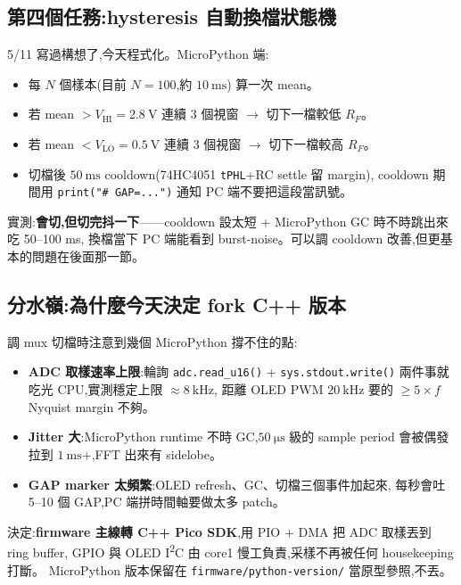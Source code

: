 \subsection*{第四個任務:hysteresis 自動換檔狀態機}

5/11 寫過構想了,今天程式化。MicroPython 端:

\begin{itemize}[leftmargin=2em,itemsep=0pt]
  \item 每 \(N\) 個樣本(目前 \(N = 100\),約 \(\SI{10}{\milli\second}\)) 算一次 mean。
  \item 若 mean \(> V_\text{HI} = \SI{2.8}{\volt}\) 連續 3 個視窗 \(\to\) 切下一檔較低 \(R_F\)。
  \item 若 mean \(< V_\text{LO} = \SI{0.5}{\volt}\) 連續 3 個視窗 \(\to\) 切下一檔較高 \(R_F\)。
  \item 切檔後 \(\SI{50}{\milli\second}\) cooldown(74HC4051 \texttt{tPHL}+RC settle 留 margin),
        cooldown 期間用 \texttt{print("\# GAP=...")} 通知 PC 端不要把這段當訊號。
\end{itemize}

實測:\textbf{會切,但切完抖一下}——cooldown 設太短 + MicroPython GC 時不時跳出來吃 50--100 ms,
換檔當下 PC 端能看到 burst-noise。可以調 cooldown 改善,但更基本的問題在後面那一節。

\subsection*{分水嶺:為什麼今天決定 fork C++ 版本}

調 mux 切檔時注意到幾個 MicroPython 撐不住的點:

\begin{itemize}[leftmargin=2em,itemsep=0pt]
  \item \textbf{ADC 取樣速率上限}:輪詢 \texttt{adc.read\_u16()} +
        \texttt{sys.stdout.write()} 兩件事就吃光 CPU,實測穩定上限 \(\approx \SI{8}{\kilo\hertz}\),
        距離 OLED PWM \(\SI{20}{\kilo\hertz}\) 要的 \(\geq 5 \times f\) Nyquist margin 不夠。
  \item \textbf{Jitter 大}:MicroPython runtime 不時 GC,\(\SI{50}{\micro\second}\) 級的 sample period
        會被偶發拉到 \(\SI{1}{\milli\second}\)+,FFT 出來有 sidelobe。
  \item \textbf{GAP marker 太頻繁}:OLED refresh、GC、切檔三個事件加起來,
        每秒會吐 5--10 個 GAP,PC 端拼時間軸要做太多 patch。
\end{itemize}

決定:\textbf{firmware 主線轉 C++ Pico SDK},用 PIO + DMA 把 ADC 取樣丟到 ring buffer,
GPIO 與 OLED I\textsuperscript{2}C 由 core1 慢工負責,采樣不再被任何 housekeeping 打斷。
MicroPython 版本保留在 \texttt{firmware/python-version/} 當原型參照,不丟。

